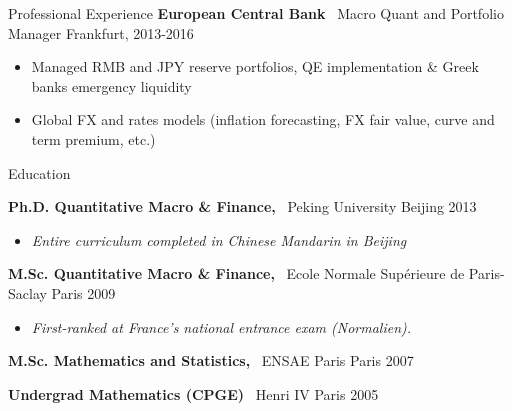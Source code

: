 \documentclass[usegeometry, 10pt, a4paper]{cv} %
\newcommand{\activite}[1]{\textbf{#1}\ }
\begin{document}
\begin{rubriquetableau}[0.95\textwidth]{Professional Experience}
\activite{European Central Bank} Macro Quant and Portfolio Manager \hfill Frankfurt, 2013-2016 \\
\vspace{-0.2cm}

\begin{itemize}[]
  \item Managed RMB and JPY reserve portfolios, QE implementation \& Greek banks emergency liquidity
  \item Global FX and rates models (inflation forecasting, FX fair value, curve and term premium, etc.)
\end{itemize}

\end{rubriquetableau}
\begin{rubriquetableau}[0.95\textwidth]{Education}\\
  \vspace{-0.5cm}
  
  \activite{Ph.D. Quantitative Macro \& Finance,} Peking University \hfill Beijing 2013\\ 
\vspace{-0.5cm}  
  \begin{itemize}[label={},
    rightmargin=\dimexpr\linewidth-13cm-\leftmargin\relax]
  \item \small{\emph{Entire curriculum completed in Chinese Mandarin in Beijing}}
  \end{itemize}
  
  \vspace{0.2cm}
  
  \activite{M.Sc. Quantitative Macro \& Finance,} Ecole Normale Supérieure de Paris-Saclay \hfill Paris 2009\\
  \vspace{-0.5cm}
  \begin{itemize}[label={}, rightmargin=\dimexpr\linewidth-13cm-\leftmargin\relax]
  \item \small{\emph{First-ranked at France's national entrance exam (Normalien).}}
  \end{itemize}

  \vspace{0.2cm}


  \activite{M.Sc. Mathematics and Statistics,} ENSAE Paris \hfill Paris 2007\\
  \vspace{0.2cm}

  \activite{Undergrad Mathematics (CPGE)} Henri IV \hfill Paris 2005\\
  \end{rubriquetableau}
\end{document}
